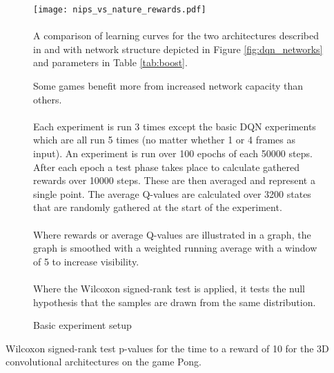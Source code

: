 \begin{figure}[htpb]
  \centering
  \texttt{[image: nips\_vs\_nature\_rewards.pdf]}
  \raggedright
  \paragraph{}
    A comparison of learning curves for the two architectures described in
    \cite{Mnih2013} and \cite{Mnih2015}
    with network structure depicted in Figure \ref{fig:dqn_networks}
    and parameters in Table \ref{tab:boost}.

    Some games benefit more from increased network capacity than others.
  \label{fig:nips_vs_nature_rewards}
\end{figure}

\begin{figure}[]
  \paragraph{}
  Each experiment is run 3 times
  except the basic DQN experiments which are all run 5 times
  (no matter whether 1 or 4 frames as input).
  An experiment is run over 100 epochs of each 50000 steps.
  After each epoch a test phase takes place to calculate gathered rewards
  over 10000 steps.
  These are then averaged and represent a single point.
  The average Q-values are calculated over 3200 states
  that are randomly gathered at the start of the experiment.

  \paragraph{}
  Where rewards or average Q-values are illustrated in a graph,
  the graph is smoothed with a weighted running average
  with a window of 5
  to increase visibility.

  \paragraph{}
  Where the Wilcoxon signed-rank test is applied,
  it tests the null hypothesis that the samples
  are drawn from the same distribution.

  \caption{Basic experiment setup}
  \label{fig:basic_setup}
\end{figure}

\begin{table}
  \center
  \renewcommand{\arraystretch}{1.3}
  
  \caption[Statistical results for 3D Conv]{
    Wilcoxon signed-rank test p-values
    for the time to a reward of 10
    for the 3D convolutional architectures
    on the game Pong.
  }
  \label{tab:conv3d_wilcoxon}
\end{table}


